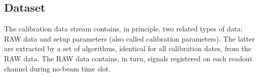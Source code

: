 \subsection{Dataset}

The calibration data stream contains, in principle, two related types of data: RAW data and setup parameters (also called calibration parameters). The latter are extracted by a set of algorithms, identical for all calibration dates, from the RAW data.
The RAW data contains, in turn, signals registered on each readout channel during no-beam time slot.

  

